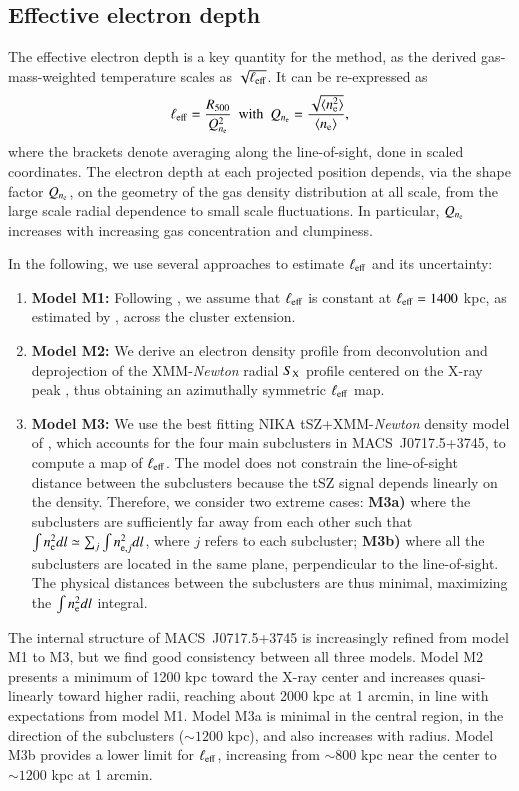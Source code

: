 \documentclass[twocolumn,traditabstract]{aa}
\newcommand{\ccor}[1]{\textcolor{Mypink}{#1}}
\def\xe {n_{\rm e}}
\begin{document}
\subsection{Effective electron depth}
\ccor{The effective electron depth is a key quantity for the method, as the derived gas-mass-weighted temperature scales as $\sqrt{\ell_{\rm eff}}$. It can be re-expressed as
\begin{equation}
\ell_{\rm eff} = \frac{R_{500}}{Q_{n_{\rm e}}^2}~~{\rm with}~~Q_{n_{\rm e}} = \frac{ \sqrt{\langle \xe^2\rangle}}{ \langle\xe\rangle},
\label{eq:Q_ne}
\end{equation}
where the brackets denote averaging along the line-of-sight, done in scaled coordinates. The electron depth at each projected position depends, via the shape factor $Q_{n_{\rm e}}$, on the geometry of the gas density distribution at all scale, from the large scale radial dependence to small scale fluctuations. In particular, $Q_{n_{\rm e}}$ increases with increasing gas concentration and clumpiness.}

In the following, we use several approaches to estimate $\ell_{\rm eff}$ and its uncertainty:
\begin{enumerate}
\item {\bf Model M1:} Following \cite{Sayers2013}, we assume that $\ell_{\rm eff}$ is constant at $\ell_{\rm eff}=1400$ kpc, as estimated by \citet{Mroczkowski2012}, across the cluster extension. 
\item {\bf Model M2:} We derive an electron density profile from deconvolution and deprojection of the XMM-\textit{Newton} radial $S_{\rm X}$ profile centered on the X-ray peak \citep{Croston2006}, thus obtaining an azimuthally symmetric $\ell_{\rm eff}$ map. 
\item {\bf Model M3:} We use the best fitting NIKA tSZ+XMM-\textit{Newton} density model of \cite{Adam2016b}, which accounts for the four main subclusters in \mbox{MACS~J0717.5+3745}, to compute a map of $\ell_{\rm eff}$. The model does not constrain the line-of-sight distance between the subclusters because the tSZ signal depends linearly on the density. Therefore, we consider two extreme cases: {\bf M3a)} where the subclusters are sufficiently far away from each other such that $\int n_{\rm e}^2 dl \simeq \sum_j \int n_{{\rm e},j}^2 dl$, where $j$ refers to each subcluster; {\bf M3b)} where all the subclusters are located \ccor{in the same plane, perpendicular to the line-of-sight. The physical distances between the subclusters are thus minimal, maximizing the $\int n_{\rm e}^2 dl$ integral.}
\end{enumerate}
The internal structure of \mbox{MACS~J0717.5+3745} is increasingly refined from model M1 to M3, but we find good consistency between all three models. Model M2 presents a minimum of 1200 kpc toward the X-ray center and increases quasi-linearly toward higher radii, reaching about 2000 kpc at 1 arcmin, in line with expectations from model M1. Model M3a is minimal in the central region, in the direction of the subclusters ($\sim 1200$ kpc), and also increases with radius. Model M3b provides a lower limit for $\ell_{\rm eff}$, increasing from $\sim 800$ kpc near the center to $\sim 1200$ kpc at 1 arcmin.
\end{document}
